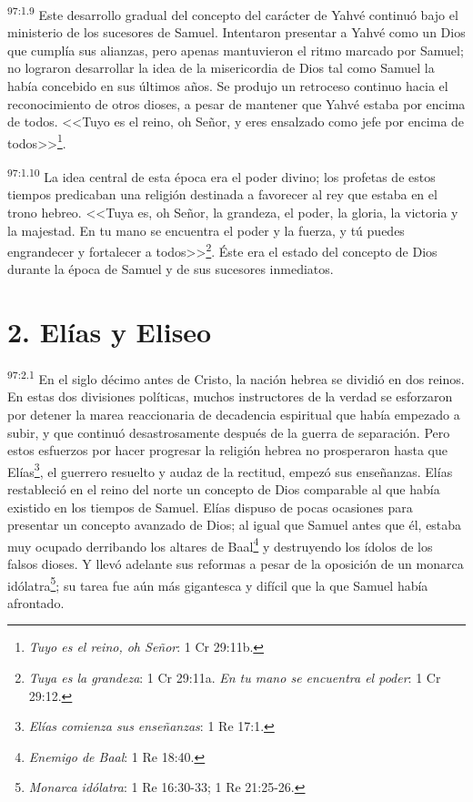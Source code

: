 \par
\textsuperscript{97:1.9} Este desarrollo gradual del concepto del carácter de Yahvé continuó bajo el ministerio de los sucesores de Samuel. Intentaron presentar a Yahvé como un Dios que cumplía sus alianzas, pero apenas mantuvieron el ritmo marcado por Samuel; no lograron desarrollar la idea de la misericordia de Dios tal como Samuel la había concebido en sus últimos años. Se produjo un retroceso continuo hacia el reconocimiento de otros dioses, a pesar de mantener que Yahvé estaba por encima de todos. <<Tuyo es el reino, oh Señor, y eres ensalzado como jefe por encima de todos>>\footnote{\textit{Tuyo es el reino, oh Señor}: 1 Cr 29:11b.}.

\par
\textsuperscript{97:1.10} La idea central de esta época era el poder divino; los profetas de estos tiempos predicaban una religión destinada a favorecer al rey que estaba en el trono hebreo. <<Tuya es, oh Señor, la grandeza, el poder, la gloria, la victoria y la majestad. En tu mano se encuentra el poder y la fuerza, y tú puedes engrandecer y fortalecer a todos>>\footnote{\textit{Tuya es la grandeza}: 1 Cr 29:11a. \textit{En tu mano se encuentra el poder}: 1 Cr 29:12.}. Éste era el estado del concepto de Dios durante la época de Samuel y de sus sucesores inmediatos.

\section*{2. Elías y Eliseo}
\par
\textsuperscript{97:2.1} En el siglo décimo antes de Cristo, la nación hebrea se dividió en dos reinos. En estas dos divisiones políticas, muchos instructores de la verdad se esforzaron por detener la marea reaccionaria de decadencia espiritual que había empezado a subir, y que continuó desastrosamente después de la guerra de separación. Pero estos esfuerzos por hacer progresar la religión hebrea no prosperaron hasta que Elías\footnote{\textit{Elías comienza sus enseñanzas}: 1 Re 17:1.}, el guerrero resuelto y audaz de la rectitud, empezó sus enseñanzas. Elías restableció en el reino del norte un concepto de Dios comparable al que había existido en los tiempos de Samuel. Elías dispuso de pocas ocasiones para presentar un concepto avanzado de Dios; al igual que Samuel antes que él, estaba muy ocupado derribando los altares de Baal\footnote{\textit{Enemigo de Baal}: 1 Re 18:40.} y destruyendo los ídolos de los falsos dioses. Y llevó adelante sus reformas a pesar de la oposición de un monarca idólatra\footnote{\textit{Monarca idólatra}: 1 Re 16:30-33; 1 Re 21:25-26.}; su tarea fue aún más gigantesca y difícil que la que Samuel había afrontado.

